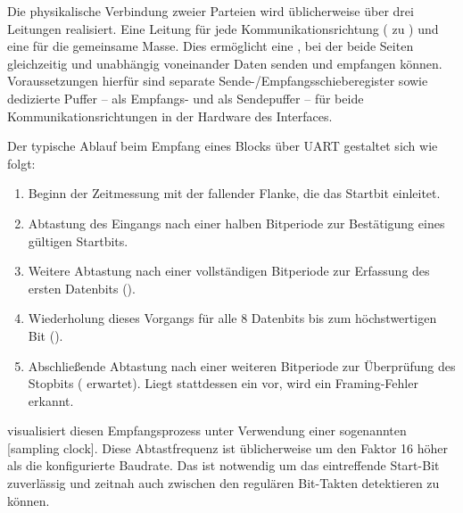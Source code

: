Die physikalische Verbindung zweier Parteien wird \"ublicherweise \"uber drei Leitungen realisiert. Eine Leitung f\"ur jede Kommunikationsrichtung ( zu ) und eine f\"ur die gemeinsame Masse. Dies erm\"oglicht eine , bei der beide Seiten gleichzeitig und unabh\"angig voneinander Daten senden und empfangen k\"onnen. Voraussetzungen hierf\"ur sind separate Sende-/Empfangsschieberegister sowie dedizierte Puffer --  als Empfangs- und  als Sendepuffer -- f\"ur beide Kommunikationsrichtungen in der Hardware des Interfaces. \\

\newpage
Der typische Ablauf beim Empfang eines Blocks \"uber UART gestaltet sich wie folgt:

\begin{enumerate}
	\item Beginn der Zeitmessung mit der fallender Flanke, die das Startbit einleitet.
	\item Abtastung des Eingangs nach einer halben Bitperiode zur Best\"atigung eines g\"ultigen Startbits.
	\item Weitere Abtastung nach einer vollst\"andigen Bitperiode zur Erfassung des ersten Datenbits ().
	\item Wiederholung dieses Vorgangs f\"ur alle 8 Datenbits bis zum h\"ochstwertigen Bit ().
	\item Abschlie{\ss}ende Abtastung nach einer weiteren Bitperiode zur \"Uberpr\"ufung des Stopbits ( erwartet). Liegt stattdessen ein  vor, wird ein Framing-Fehler erkannt.
\end{enumerate}

 visualisiert diesen Empfangsprozess unter Verwendung einer sogenannten [sampling clock]. Diese Abtastfrequenz ist \"ublicherweise um den Faktor 16 h\"oher als die konfigurierte Baudrate. Das  ist notwendig um das eintreffende Start-Bit zuverl\"assig und zeitnah auch zwischen den regul\"aren Bit-Takten detektieren zu k\"onnen.

